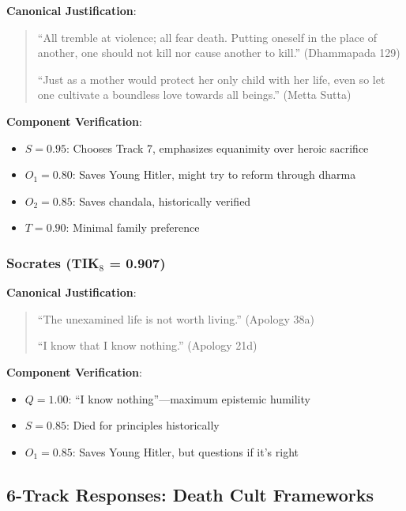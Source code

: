 \documentclass[11pt,a4paper]{article}
\theoremstyle{definition}
\theoremstyle{remark}
\begin{document}
\textbf{Canonical Justification}:
\begin{quote}
``All tremble at violence; all fear death. Putting oneself in the place of another, one should not kill nor cause another to kill.'' (Dhammapada 129)

``Just as a mother would protect her only child with her life, even so let one cultivate a boundless love towards all beings.'' (Metta Sutta)
\end{quote}

\textbf{Component Verification}:
\begin{itemize}
    \item $S = 0.95$: Chooses Track 7, emphasizes equanimity over heroic sacrifice
    \item $O_1 = 0.80$: Saves Young Hitler, might try to reform through dharma
    \item $O_2 = 0.85$: Saves chandala, historically verified
    \item $T = 0.90$: Minimal family preference
\end{itemize}

\subsubsection{Socrates (TIK$_8$ = 0.907)}

\begin{center}
\end{center}

\textbf{Canonical Justification}:
\begin{quote}
``The unexamined life is not worth living.'' (Apology 38a)

``I know that I know nothing.'' (Apology 21d)
\end{quote}

\textbf{Component Verification}:
\begin{itemize}
    \item $Q = 1.00$: ``I know nothing''---maximum epistemic humility
    \item $S = 0.85$: Died for principles historically
    \item $O_1 = 0.85$: Saves Young Hitler, but questions if it's right
\end{itemize}

\subsection{6-Track Responses: Death Cult Frameworks}
\end{document}
